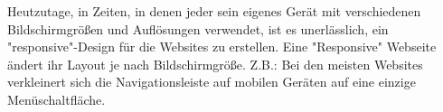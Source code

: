 
Heutzutage, in Zeiten, in denen jeder sein eigenes Gerät mit verschiedenen Bildschirmgrößen und Auflösungen verwendet, ist es unerlässlich, ein "responsive"-Design für die Websites zu erstellen. Eine "Responsive" Webseite ändert ihr Layout je nach Bildschirmgröße. Z.B.: Bei den meisten Websites verkleinert sich die Navigationsleiste auf mobilen Geräten auf eine einzige Menüschaltfläche.


